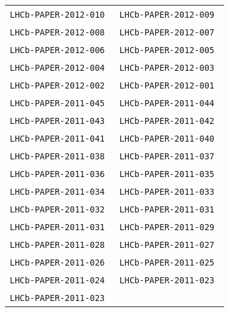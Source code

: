 \begin{center}
\begin{longtable}{ll}
\texttt{LHCb-PAPER-2012-010}~\cite{LHCb-PAPER-2012-010} & 
\texttt{LHCb-PAPER-2012-009}~\cite{LHCb-PAPER-2012-009} \\
\texttt{LHCb-PAPER-2012-008}~\cite{LHCb-PAPER-2012-008} & 
\texttt{LHCb-PAPER-2012-007}~\cite{LHCb-PAPER-2012-007} \\
\texttt{LHCb-PAPER-2012-006}~\cite{LHCb-PAPER-2012-006} & 
\texttt{LHCb-PAPER-2012-005}~\cite{LHCb-PAPER-2012-005} \\
\texttt{LHCb-PAPER-2012-004}~\cite{LHCb-PAPER-2012-004} & 
\texttt{LHCb-PAPER-2012-003}~\cite{LHCb-PAPER-2012-003} \\
\texttt{LHCb-PAPER-2012-002}~\cite{LHCb-PAPER-2012-002} & 
\texttt{LHCb-PAPER-2012-001}~\cite{LHCb-PAPER-2012-001} \\
\hline
\texttt{LHCb-PAPER-2011-045}~\cite{LHCb-PAPER-2011-045} & 
\texttt{LHCb-PAPER-2011-044}~\cite{LHCb-PAPER-2011-044} \\
\texttt{LHCb-PAPER-2011-043}~\cite{LHCb-PAPER-2011-043} & 
\texttt{LHCb-PAPER-2011-042}~\cite{LHCb-PAPER-2011-042} \\
\texttt{LHCb-PAPER-2011-041}~\cite{LHCb-PAPER-2011-041} & 
\texttt{LHCb-PAPER-2011-040}~\cite{LHCb-PAPER-2011-040} \\
\texttt{LHCb-PAPER-2011-038}~\cite{LHCb-PAPER-2011-038} &
\texttt{LHCb-PAPER-2011-037}~\cite{LHCb-PAPER-2011-037} \\
\texttt{LHCb-PAPER-2011-036}~\cite{LHCb-PAPER-2011-036} &
\texttt{LHCb-PAPER-2011-035}~\cite{LHCb-PAPER-2011-035} \\
\texttt{LHCb-PAPER-2011-034}~\cite{LHCb-PAPER-2011-034} &
\texttt{LHCb-PAPER-2011-033}~\cite{LHCb-PAPER-2011-033} \\
\texttt{LHCb-PAPER-2011-032}~\cite{LHCb-PAPER-2011-032} & 
\texttt{LHCb-PAPER-2011-031}~\cite{LHCb-PAPER-2011-031} \\
\texttt{LHCb-PAPER-2011-031}~\cite{LHCb-PAPER-2011-030} &
\texttt{LHCb-PAPER-2011-029}~\cite{LHCb-PAPER-2011-029} \\
\texttt{LHCb-PAPER-2011-028}~\cite{LHCb-PAPER-2011-028} &
\texttt{LHCb-PAPER-2011-027}~\cite{LHCb-PAPER-2011-027} \\
\texttt{LHCb-PAPER-2011-026}~\cite{LHCb-PAPER-2011-026} &
\texttt{LHCb-PAPER-2011-025}~\cite{LHCb-PAPER-2011-025} \\
\texttt{LHCb-PAPER-2011-024}~\cite{LHCb-PAPER-2011-024} &
\texttt{LHCb-PAPER-2011-023}~\cite{LHCb-PAPER-2011-023} \\
\texttt{LHCb-PAPER-2011-023}~\cite{LHCb-PAPER-2011-022} &

\end{longtable}
\end{center}
